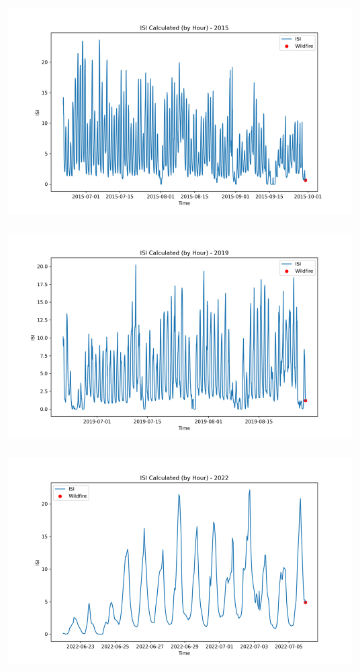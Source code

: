 \begin{figure}[h]
	\centering
	\caption{Calculated hourly ISI value for 2015, 2019, and 2022}
	\begin{subfigure}{0.45\textwidth}
		\centering
		\includegraphics[width=\textwidth]{graphs/2015/byHour/2015CalcISI12.png}
	\end{subfigure}
	\hfill
	\begin{subfigure}{0.45\textwidth}
		\centering
		\includegraphics[width=\textwidth]{graphs/2019/2019CalcISI12.png}
	\end{subfigure}
	\hfill
	\begin{subfigure}{0.45\textwidth}
		\centering
		\includegraphics[width=\textwidth]{graphs/2022/2022CalcISI12.png}
	\end{subfigure}
	\label{fig:hourly_isi}
\end{figure}

